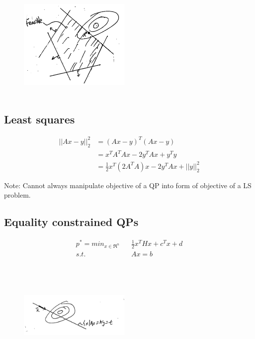 \begin{figure}
	\centering
	\includegraphics[width=2.1in,height=2.1in]{figures/ch07/figure1016_a.png}
\end{figure}

\subsection{Least squares}
\begin{align*}
||Ax - y||_2^2 &= (Ax - y)^T(Ax - y)\\
&= x^TA^TAx - 2y^TAx + y^Ty\\
&= \frac{1}{2}x^T(2A^TA)x - 2y^TAx + ||y||_2^2
\end{align*}

Note: Cannot always manipulate objective of a QP into form of objective of a LS problem.\\

\subsection{Equality constrained QPs}

\begin{align*}
p^* = min_{x\in \Re^n}\,\,\,\,\, &\frac{1}{2}x^THx + c^Tx + d\\
s.t.\,\,\,\,\, &Ax = b
\end{align*}


\begin{figure}
	\centering
	\includegraphics[width=2.1in,height=2.1in]{figures/ch07/figure1016_b.png}
\end{figure}

